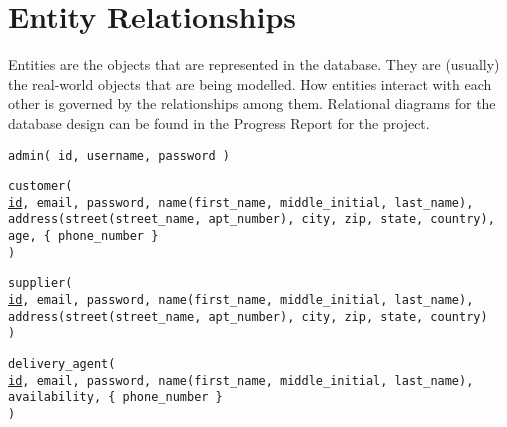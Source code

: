 \section{Entity Relationships}

Entities are the objects that are represented in the database.
They are (usually) the real-world objects that are being modelled.
How entities interact with each other is governed by the relationships among them.
Relational diagrams for the database design can be found in the Progress Report for the project.

\begin{entity}
    \hspace*{-15pt}\texttt{admin( id, username, password )}
\end{entity}

\begin{entity}
    \hspace*{-15pt}\texttt{customer( \\
        \hspace*{15pt}\underline{id}, email, password, name(first\_name, middle\_initial, last\_name), \\
        \hspace*{15pt}address(street(street\_name, apt\_number), city, zip, state, country), \\
        \hspace*{15pt}age, \{ phone\_number \} \\
    )}
\end{entity}

\begin{entity}
    \hspace*{-15pt}\texttt{supplier( \\
        \hspace*{15pt}\underline{id}, email, password, name(first\_name, middle\_initial, last\_name), \\
        \hspace*{15pt}address(street(street\_name, apt\_number), city, zip, state, country) \\
    )}
\end{entity}

\begin{entity}
    \hspace*{-15pt}\texttt{delivery\_agent( \\
        \hspace*{15pt}\underline{id}, email, password, name(first\_name, middle\_initial, last\_name), \\
        \hspace*{15pt}availability, \{ phone\_number \} \\
    )}
\end{entity}

